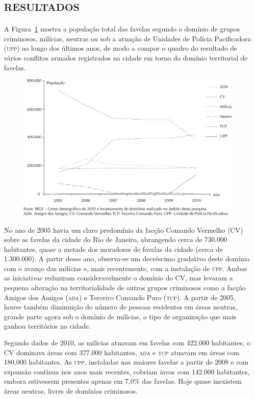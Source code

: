 \documentclass{article}
\begin{document}
\section{\textsc{resultados}}

A Figura~\ref{fig:f01}
mostra a população total das favelas segundo o domínio de grupos criminosos,
milícias, neutras ou sob a atuação de Unidades de Polícia Pacificadora (\textsc{upp}) ao
longo dos últimos anos, de modo a compor o quadro do resultado de vários
conflitos armados registrados na cidade em torno do domínio territorial de
favelas.

\begin{figure}
\includegraphics[width=\textwidth]{0034-8910-rsp-48-01-0094-gf01}
\caption{}\label{fig:f01}
\end{figure}

No ano de 2005 havia um claro predomínio da facção Comando Vermelho (CV) sobre
as favelas da cidade do Rio de Janeiro, abrangendo cerca de 730.000 habitantes,
quase a metade dos moradores de favelas da cidade (cerca de 1.300.000). A partir
desse ano, observa-se um decréscimo gradativo deste domínio com o avanço das
milícias e, mais recentemente, com a instalação de \textsc{upp}. Ambas as iniciativas
reduziram consideravelmente o domínio do CV, mas levaram a pequena alteração na
territorialidade de outros grupos criminosos como a facção Amigos dos Amigos
(\textsc{ada}) e Terceiro Comando Puro (\textsc{tcp}). A partir de 2005, houve também diminuição
do número de pessoas residentes em áreas neutras, grande parte agora sob o
domínio de milícias, o tipo de organização que mais ganhou territórios na
cidade.

Segundo dados de 2010, as milícias atuavam em favelas com 422.000 habitantes, o
CV dominava áreas com 377.000 habitantes, \textsc{ada} e \textsc{tcp} atuavam em áreas com 180.000
habitantes. As \textsc{upp}, instaladas nas maiores favelas a partir de 2008 e com
expansão contínua nos anos mais recentes, cobriam áreas com 142.000 habitantes,
embora estivessem presentes apenas em 7,0\% das favelas. Hoje quase inexistem
áreas neutras, livres de domínios criminosos.
\end{document}
